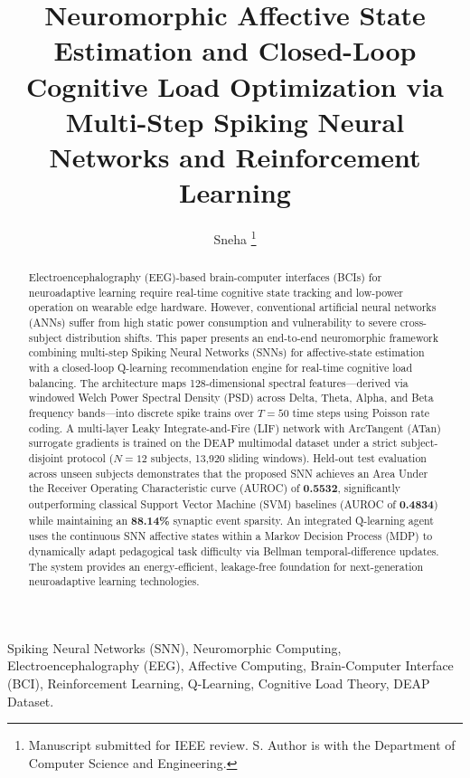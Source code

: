 \documentclass[journal]{IEEEtran}
\begin{document}
\title{Neuromorphic Affective State Estimation and Closed-Loop Cognitive Load Optimization via Multi-Step Spiking Neural Networks and Reinforcement Learning}

\author{Sneha%
\thanks{Manuscript submitted for IEEE review. S. Author is with the Department of Computer Science and Engineering.}}

\maketitle

\begin{abstract}
Electroencephalography (EEG)-based brain-computer interfaces (BCIs) for neuroadaptive learning require real-time cognitive state tracking and low-power operation on wearable edge hardware. However, conventional artificial neural networks (ANNs) suffer from high static power consumption and vulnerability to severe cross-subject distribution shifts. This paper presents an end-to-end neuromorphic framework combining multi-step Spiking Neural Networks (SNNs) for affective-state estimation with a closed-loop Q-learning recommendation engine for real-time cognitive load balancing. The architecture maps 128-dimensional spectral features---derived via windowed Welch Power Spectral Density (PSD) across Delta, Theta, Alpha, and Beta frequency bands---into discrete spike trains over $T = 50$ time steps using Poisson rate coding. A multi-layer Leaky Integrate-and-Fire (LIF) network with ArcTangent (ATan) surrogate gradients is trained on the DEAP multimodal dataset under a strict subject-disjoint protocol ($N=12$ subjects, 13,920 sliding windows). Held-out test evaluation across unseen subjects demonstrates that the proposed SNN achieves an Area Under the Receiver Operating Characteristic curve (AUROC) of \textbf{0.5532}, significantly outperforming classical Support Vector Machine (SVM) baselines (AUROC of \textbf{0.4834}) while maintaining an \textbf{88.14\%} synaptic event sparsity. An integrated Q-learning agent uses the continuous SNN affective states within a Markov Decision Process (MDP) to dynamically adapt pedagogical task difficulty via Bellman temporal-difference updates. The system provides an energy-efficient, leakage-free foundation for next-generation neuroadaptive learning technologies.
\end{abstract}

\begin{IEEEkeywords}
Spiking Neural Networks (SNN), Neuromorphic Computing, Electroencephalography (EEG), Affective Computing, Brain-Computer Interface (BCI), Reinforcement Learning, Q-Learning, Cognitive Load Theory, DEAP Dataset.
\end{IEEEkeywords}
\end{document}
